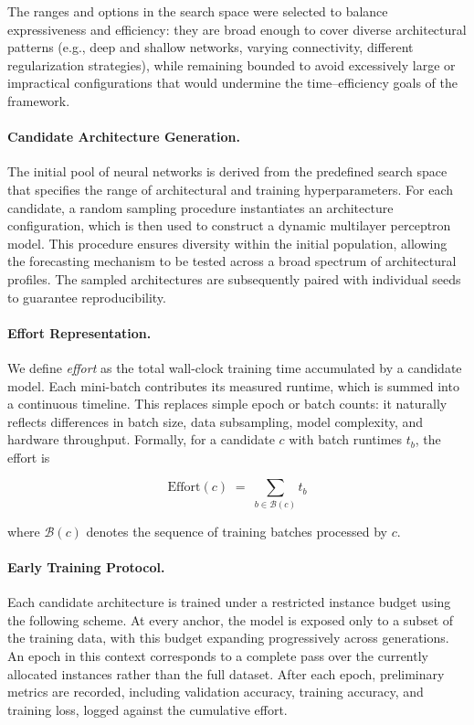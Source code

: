 \documentclass[stu,12pt,floatsintext,doublespacing]{apa7}
\begin{document}
The ranges and options in the search space were selected to balance expressiveness and efficiency: they are broad enough to cover diverse architectural patterns (e.g., deep and shallow networks, varying connectivity, different regularization strategies), while remaining bounded to avoid excessively large or impractical configurations that would undermine the time--efficiency goals of the framework.


\paragraph{Candidate Architecture Generation.}
The initial pool of neural networks is derived from the predefined search space that specifies the range of architectural and training hyperparameters. For each candidate, a random sampling procedure instantiates an architecture configuration, which is then used to construct a dynamic multilayer perceptron model. This procedure ensures diversity within the initial population, allowing the forecasting mechanism to be tested across a broad spectrum of architectural profiles. The sampled architectures are subsequently paired with individual seeds to guarantee reproducibility.

\paragraph{Effort Representation.}  \label{sec:effort_representation}
We define \emph{effort} as the total wall-clock training time accumulated by a candidate model. Each mini-batch contributes its measured runtime, which is summed into a continuous timeline. This replaces simple epoch or batch counts: it naturally reflects differences in batch size, data subsampling, model complexity, and hardware throughput. Formally, for a candidate $c$ with batch runtimes $t_b$, the effort is

\[
\text{Effort}(c) \;=\; \sum_{b \in \mathcal{B}(c)} t_b
\]

where $\mathcal{B}(c)$ denotes the sequence of training batches processed by $c$.

\paragraph{Early Training Protocol.}  
Each candidate architecture is trained under a restricted instance budget using the following scheme. At every anchor, the model is exposed only to a subset of the training data, with this budget expanding progressively across generations. An epoch in this context corresponds to a complete pass over the currently allocated instances rather than the full dataset. After each epoch, preliminary metrics are recorded, including validation accuracy, training accuracy, and training loss, logged against the cumulative effort.
\end{document}
